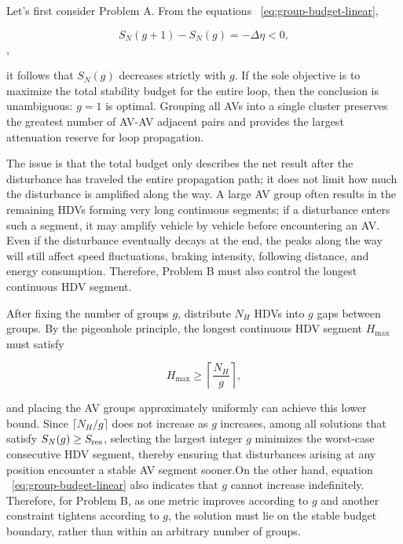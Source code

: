 \documentclass[11pt,a4paper,openany]{book}
\numberwithin{equation}{chapter}
\numberwithin{figure}{chapter}
\numberwithin{table}{chapter}
\begin{document}
Let’s first consider Problem A. From the equations ~\eqref{eq:group-budget-linear},

\[
S_N(g+1)-S_N(g)=-\Delta\eta<0,
\],

it follows that $S_N(g)$ decreases strictly with $g$. If the sole objective is to maximize the total stability budget for the entire loop, then the conclusion is unambiguous: $g=1$ is optimal. Grouping all AVs into a single cluster preserves the greatest number of AV-AV adjacent pairs and provides the largest attenuation reserve for loop propagation.




The issue is that the total budget only describes the net result after the disturbance has traveled the entire propagation path; it does not limit how much the disturbance is amplified along the way. A large AV group often results in the remaining HDVs forming very long continuous segments; if a disturbance enters such a segment, it may amplify vehicle by vehicle before encountering an AV. Even if the disturbance eventually decays at the end, the peaks along the way will still affect speed fluctuations, braking intensity, following distance, and energy consumption. Therefore, Problem B must also control the longest continuous HDV segment.




After fixing the number of groups $g$, distribute $N_H$ HDVs into $g$ gaps between groups. By the pigeonhole principle, the longest continuous HDV segment $H_{\max}$ must satisfy

\begin{equation}
H_{\max}\ge\left\lceil\frac{N_H}{g}\right\rceil,
\label{eq:group-pigeonhole}
\end{equation}

and placing the AV groups approximately uniformly can achieve this lower bound. Since $\lceil N_H/g\rceil$ does not increase as $g$ increases, among all solutions that satisfy $S_N(g)\ge S_{\rm res}$, selecting the largest integer $g$ minimizes the worst-case consecutive HDV segment, thereby ensuring that disturbances arising at any position encounter a stable AV segment sooner.On the other hand, equation ~\eqref{eq:group-budget-linear} also indicates that $g$ cannot increase indefinitely. Therefore, for Problem B, as one metric improves according to $g$ and another constraint tightens according to $g$, the solution must lie on the stable budget boundary, rather than within an arbitrary number of groups.
\end{document}
